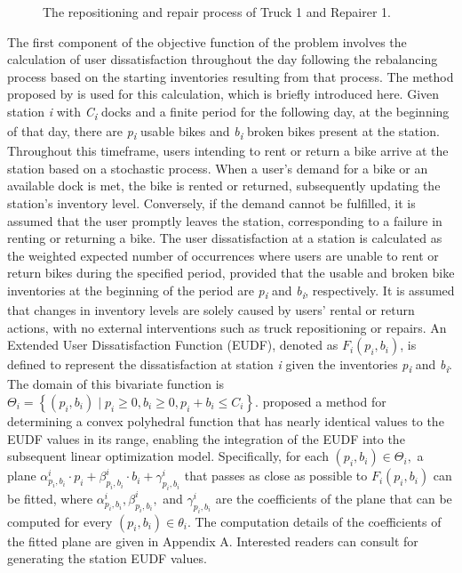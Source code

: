 \begin{figure}[htbp]
\centering
{}
\caption{The repositioning and repair process of Truck 1 and Repairer 1.}
\label{ch4:fig:repositioning-repair-process}
\end{figure}

The first component of the objective function of the problem involves the calculation of user
dissatisfaction throughout the day following the rebalancing process based on the starting
inventories resulting from that process. The method proposed by \citet{kaspiBikesharingSystemsUser2017} is used for this
calculation, which is briefly introduced here. Given station \emph{i} with \emph{C\textsubscript{i}}
docks and a finite period for the following day, at the beginning of that day, there are
\emph{p\textsubscript{i}} usable bikes and \emph{b\textsubscript{i}} broken bikes present at the
station. Throughout this timeframe, users intending to rent or return a bike arrive at the station
based on a stochastic process. When a user's demand for a bike or an available dock is met, the bike
is rented or returned, subsequently updating the station's inventory level. Conversely, if the
demand cannot be fulfilled, it is assumed that the user promptly leaves the station, corresponding
to a failure in renting or returning a bike. The user dissatisfaction at a station is calculated as
the weighted expected number of occurrences where users are unable to rent or return bikes during
the specified period, provided that the usable and broken bike inventories at the beginning of the
period are \emph{p\textsubscript{i}} and \emph{b\textsubscript{i}}, respectively. It is assumed that
changes in inventory levels are solely caused by users' rental or return actions, with no external
interventions such as truck repositioning or repairs. An Extended User Dissatisfaction Function
(EUDF), denoted as \(F_{i}\left( {p_{i},b_{i}} \right)\), is defined to represent the
dissatisfaction at station \emph{i} given the inventories \emph{p\textsubscript{i}} and
\emph{b\textsubscript{i}}. The domain of this bivariate function is
\(\Theta_{i} = \left\{ {\left( {p_{i},b_{i}} \right) \mid p_{i} \geq 0,b_{i} \geq 0,p_{i} + b_{i} \leq C_{i}} \right\}\).
\citet{kaspiBikesharingSystemsUser2017} proposed a method for determining a convex polyhedral function that has nearly
identical values to the EUDF values in its range, enabling the integration of the EUDF into the
subsequent linear optimization model. Specifically, for each
\(\left( {p_{i},b_{i}} \right) \in \Theta_{i},\) a plane
\(\alpha_{p_{i},b_{i}}^{i} \cdot p_{i} + \beta_{p_{i},b_{i}}^{i} \cdot b_{i} + \gamma_{p_{i},b_{i}}^{i}\)
that passes as close as possible to \(F_{i}\left( {p_{i},b_{i}} \right)\) can be fitted, where
\(\alpha_{p_{i},b_{i}}^{i},\beta_{p_{i},b_{i}}^{i},\) and \(\gamma_{p_{i},b_{i}}^{i}\) are the
coefficients of the plane that can be computed for every
\(\left( {p_{i},b_{i}} \right) \in \theta_{i}\). The computation details of the coefficients of the
fitted plane are given in Appendix A. Interested readers can consult \citet{kaspiBikesharingSystemsUser2017} for
generating the station EUDF values.

